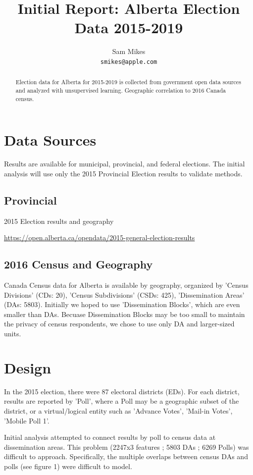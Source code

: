 \documentclass{article}
\title{Initial Report: Alberta Election Data 2015-2019}
\author{%
  Sam Mikes \\
  \texttt{smikes@apple.com} \\
}
\begin{document}
\maketitle

\begin{abstract}
  Election data for Alberta for 2015-2019 is collected
  from government open data sources and analyzed with unsupervised
  learning. Geographic correlation to 2016 Canada census.
\end{abstract}

\section{Data Sources}

Results are available for municipal, provincial, and federal elections.
The initial analysis will use only the 2015 Provincial Election results to validate methods. 

\subsection{Provincial}

2015 Election results and geography

\url{https://open.alberta.ca/opendata/2015-general-election-results}

\subsection{2016 Census and Geography}

Canada Census data for Alberta is available by geography, organized by 'Census Divisions' (CDs: 20), 'Census Subdivisions' (CSDs: 425), 'Dissemination Areas' (DAs: 5803).  Initially we hoped to use 'Dissemination Blocks', which are even smaller than DAs.  Becuase Dissemination Blocks may be too small to maintain the privacy of census respondents, we chose to use only DA and larger-sized units.

\section{Design}

In the 2015 election, there were 87 electoral districts (EDs). For each district, results are reported by 'Poll', where a Poll may be a geographic subset of the district, or a virtual/logical entity such as 'Advance Votes', 'Mail-in Votes', 'Mobile Poll 1'.

Initial analysis attempted to connect results by poll to census data at dissemination areas.  This problem (2247x3 features ; 5803 DAs ; 6269 Polls) was difficult to approach.  Specifically, the multiple overlaps between census DAs and polls (see figure 1) were difficult to model.
\end{document}

